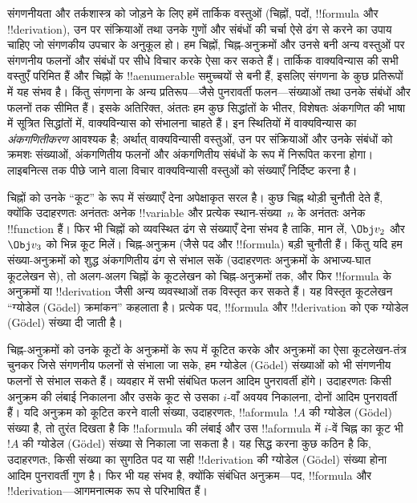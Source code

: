 \documentclass[../../../include/open-logic-section]{subfiles}
\begin{document}

संगणनीयता और तर्कशास्त्र को जोड़ने के लिए हमें तार्किक वस्तुओं (चिह्नों,
पदों, !!{formula} और !!{derivation}), उन पर संक्रियाओं तथा उनके गुणों और
संबंधों की चर्चा ऐसे ढंग से करने का उपाय चाहिए जो संगणकीय उपचार के अनुकूल हो।
हम चिह्नों, चिह्न-अनुक्रमों और उनसे बनी अन्य वस्तुओं पर संगणनीय फलनों और
संबंधों पर सीधे विचार करके ऐसा कर सकते हैं। तार्किक वाक्यविन्यास की सभी
वस्तुएँ परिमित हैं और चिह्नों के !!a{enumerable} समुच्चयों से बनी हैं, इसलिए
संगणना के कुछ प्रतिरूपों में यह संभव है। किंतु संगणना के अन्य प्रतिरूप—जैसे
पुनरावर्ती फलन—संख्याओं तथा उनके संबंधों और फलनों तक सीमित हैं। इसके अतिरिक्त,
अंततः हम कुछ सिद्धांतों के भीतर, विशेषतः अंकगणित की भाषा में सूत्रित सिद्धांतों
में, वाक्यविन्यास को संभालना चाहते हैं। इन स्थितियों में वाक्यविन्यास का
\emph{अंकगणितीकरण} आवश्यक है; अर्थात् वाक्यविन्यासी वस्तुओं, उन पर संक्रियाओं
और उनके संबंधों को क्रमशः संख्याओं, अंकगणितीय फलनों और अंकगणितीय संबंधों के
रूप में निरूपित करना होगा। लाइबनित्स तक पीछे जाने वाला विचार वाक्यविन्यासी
वस्तुओं को संख्याएँ निर्दिष्ट करना है।

चिह्नों को उनके ``कूट'' के रूप में संख्याएँ देना अपेक्षाकृत सरल है। कुछ चिह्न
थोड़ी चुनौती देते हैं, क्योंकि उदाहरणतः अनंततः अनेक !!{variable} और प्रत्येक
स्थान-संख्या~$n$ के अनंततः अनेक !!{function} हैं। फिर भी चिह्नों को व्यवस्थित
ढंग से संख्याएँ देना संभव है ताकि, मान लें, $\Obj v_2$ और $\Obj v_3$ को भिन्न
कूट मिलें। चिह्न-अनुक्रम (जैसे पद और !!{formula}) बड़ी चुनौती हैं। किंतु यदि
हम संख्या-अनुक्रमों को शुद्ध अंकगणितीय ढंग से संभाल सकें (उदाहरणतः अनुक्रमों के
अभाज्य-घात कूटलेखन से), तो अलग-अलग चिह्नों के कूटलेखन को चिह्न-अनुक्रमों तक,
और फिर !!{formula} के अनुक्रमों या !!{derivation} जैसी अन्य व्यवस्थाओं तक
विस्तृत कर सकते हैं। यह विस्तृत कूटलेखन ``ग्योडेल (G\"odel) क्रमांकन''
कहलाता है। प्रत्येक पद, !!{formula} और !!{derivation} को एक ग्योडेल (G\"odel)
संख्या दी जाती है।

चिह्न-अनुक्रमों को उनके कूटों के अनुक्रमों के रूप में कूटित करके और अनुक्रमों
का ऐसा कूटलेखन-तंत्र चुनकर जिसे संगणनीय फलनों से संभाला जा सके, हम ग्योडेल (G\"odel)
 संख्याओं को भी संगणनीय फलनों से संभाल सकते हैं। व्यवहार में सभी
संबंधित फलन आदिम पुनरावर्ती होंगे। उदाहरणतः किसी अनुक्रम की लंबाई निकालना और
उसके कूट से उसका $i$-वाँ अवयव निकालना, दोनों आदिम पुनरावर्ती हैं। यदि अनुक्रम
को कूटित करने वाली संख्या, उदाहरणतः, !!a{formula}~$!A$ की ग्योडेल (G\"odel)
संख्या है, तो तुरंत दिखता है कि !!a{formula} की लंबाई और उस !!a{formula} में $i$-वें चिह्न
का कूट भी~$!A$ की ग्योडेल (G\"odel) संख्या से निकाला जा सकता है। यह सिद्ध
करना कुछ कठिन है कि, उदाहरणतः, किसी संख्या का सुगठित पद या सही
!!{derivation} की ग्योडेल (G\"odel) संख्या होना आदिम पुनरावर्ती गुण है। फिर भी
यह संभव है, क्योंकि संबंधित अनुक्रम—पद, !!{formula} और !!{derivation}—आगमनात्मक
रूप से परिभाषित हैं।
\end{document}
